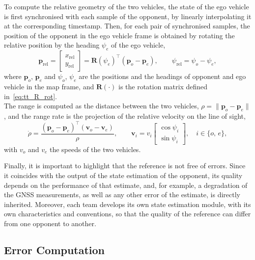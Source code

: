 To compute the relative geometry of the two vehicles, the state of the ego vehicle is first
synchronised with each sample of the opponent, by linearly interpolating it at the
corresponding timestamp. Then, for each pair of synchronised samples, the position of
the opponent in the ego vehicle frame is obtained by rotating the relative position
by the heading $\psi_e$ of the ego vehicle,
\begin{equation}
    \mathbf{p}_{\mathrm{rel}} =
    \begin{bmatrix} x_{\mathrm{rel}} \\ y_{\mathrm{rel}} \end{bmatrix}
    = \mathbf{R}(\psi_e)^\top \left(\mathbf{p}_o - \mathbf{p}_e\right),
    \qquad
    \psi_{\mathrm{rel}} = \psi_o - \psi_e,
    \label{eq:gt_rel}
\end{equation}
where $\mathbf{p}_o$, $\mathbf{p}_e$ and $\psi_o$, $\psi_e$ are the positions and the
headings of opponent and ego vehicle in the map frame, and $\mathbf{R}(\cdot)$ is the
rotation matrix defined in~\eqref{eq:tt_R_rot}. \\The range is computed as the distance between the
two vehicles, $\rho = \|\mathbf{p}_o - \mathbf{p}_e\|$, and the range rate is the
projection of the relative velocity on the line of sight,
\begin{equation}
    \dot\rho = \frac{\left(\mathbf{p}_o - \mathbf{p}_e\right)^\top
    \left(\mathbf{v}_o - \mathbf{v}_e\right)}{\rho},
    \qquad
    \mathbf{v}_i = v_i \begin{bmatrix} \cos\psi_i \\ \sin\psi_i \end{bmatrix},
    \quad i \in \{o,\,e\},
    \label{eq:gt_rhodot}
\end{equation}
with $v_o$ and $v_e$ the speeds of the two vehicles.

Finally, it is important to highlight that the reference is not free of errors. Since it coincides with the output of the
state estimation of the opponent, its quality depends on the performance of that
estimate, and, for example, a degradation of the GNSS measurements, as well as any other error of the
estimate, is directly inherited. Moreover, each team develops its own state estimation module, with its own
characteristics and conventions, so that the quality of the reference can differ from one
opponent to another.

\subsection{Error Computation}
\label{subsec:err_frames}

